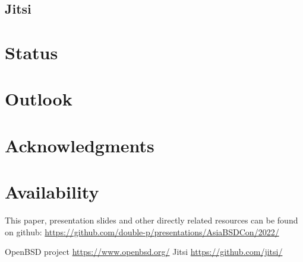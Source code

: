\documentclass[conference]{IEEEtran}
\begin{document}
\subsection{Jitsi}
\section{Status}
\section{Outlook}
\section{Acknowledgments}







\section{Availability}
This paper, presentation slides and other directly related resources can be found on github:
\url{https://github.com/double-p/presentations/AsiaBSDCon/2022/}


\begin{thebibliography}{00}
 OpenBSD project \url{https://www.openbsd.org/}
 Jitsi \url{https://github.com/jitsi/}

\end{thebibliography}
\end{document}

